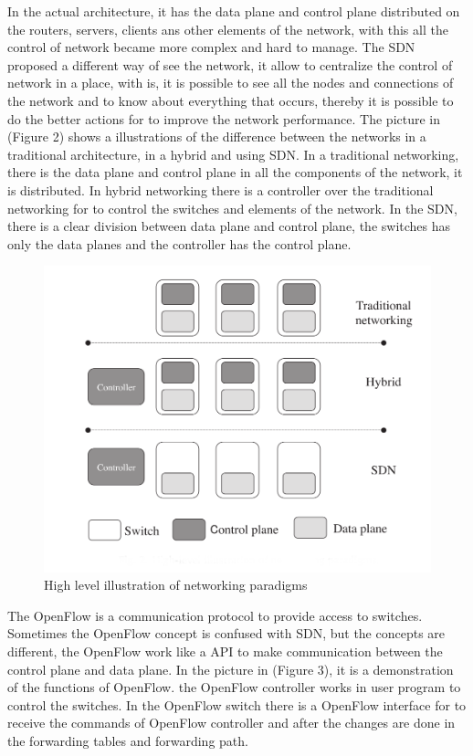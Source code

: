 \documentclass[12pt]{article}
\begin{document}
In the actual architecture, it has the data plane and control plane distributed on the routers, servers, clients ans other elements of the network, with this all the control of network became more complex and hard to manage. The SDN proposed a different way of see the network, it allow to centralize the control of network in a place, with is, it is possible to see all the nodes and connections of the network and to know about everything that occurs, thereby it is possible to do the better actions for to improve the network performance. The picture in (Figure 2) shows a illustrations of the difference between the networks in a traditional architecture, in a hybrid and using SDN. In a traditional networking, there is the data plane and control plane in all the components of the network, it is distributed. In hybrid networking there is a controller over the traditional networking for to control the switches and elements of the network. In the SDN, there is a clear division between data plane and control plane, the switches has only the data planes and the controller has the control plane.

\begin{figure}[ht]
\centering
\includegraphics[width=.7\textwidth]{figure2.png}
\caption{High level illustration of networking paradigms}
\label{figure 2: High level illustration of networking paradigms}
\end{figure}

The OpenFlow is a communication protocol to provide access to switches. Sometimes the OpenFlow concept is confused with SDN, but the concepts are different, the OpenFlow work like a API to make communication between the control plane and data plane. In the picture in (Figure 3), it is a demonstration of the functions of OpenFlow. the OpenFlow controller works in user program to control the switches. In the OpenFlow switch there is a OpenFlow interface for to receive the commands of OpenFlow controller and after the changes are done in the forwarding tables and forwarding path.
\end{document}
